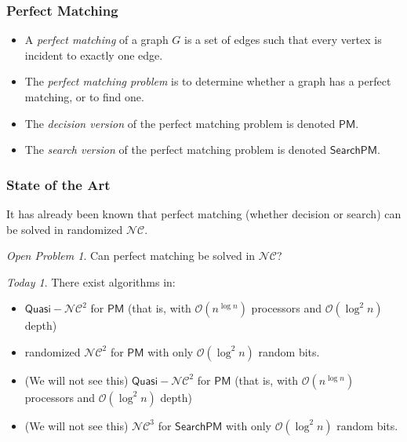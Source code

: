 \documentclass{beamer}
\theoremstyle{remark}
\newtheorem{open}{Open Problem}
\newtheorem{resolved}{Today}
\newcommand{\dpm}{\mathsf{PM}}
\newcommand{\spm}{\mathsf{SearchPM}}
\newcommand{\nc}{{\mathcal{NC}}}
\newcommand{\OO}{\mathcal{O}}
\begin{document}
\begin{frame}
  \frametitle{Perfect Matching}

  \begin{definition}
    \begin{itemize}
      \item A \emph{perfect matching} of a graph $G$ is a set of edges
            such that every vertex is incident to exactly one edge.
      \item The \emph{perfect matching problem} is to determine whether
            a graph has a perfect matching, or to find one.
      \item The \emph{decision version} of the perfect matching problem
            is denoted $\dpm$.
      \item The \emph{search version} of the perfect matching problem
            is denoted $\spm$.
    \end{itemize}
  \end{definition}
\end{frame}

\begin{frame}
  \frametitle{State of the Art}

  It has already been known that perfect matching (whether decision or search)
  can be solved in randomized $\nc$.

  \begin{open}
    Can perfect matching be solved in $\nc$?
  \end{open}

  \begin{resolved}
    There exist algorithms in:
    \begin{itemize}
      \item $\mathsf{Quasi-}\nc^2$ for $\dpm$
            (that is, with $\OO(n^{\log n})$ processors and
            $\OO(\log^2 n)$ depth)
      \item randomized $\nc^2$ for $\dpm$
            with only $\OO(\log^2 n)$ random bits.
      \item (We will not see this) $\mathsf{Quasi-}\nc^2$ for $\dpm$
            (that is, with $\OO(n^{\log n})$ processors and
            $\OO(\log^2 n)$ depth)
      \item (We will not see this) $\nc^3$ for $\spm$
            with only $\OO(\log^2 n)$ random bits.
    \end{itemize}
  \end{resolved}
\end{frame}
\end{document}
